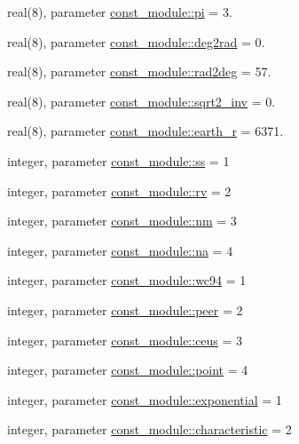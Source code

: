 \begin{DoxyCompactItemize}
\item 
real(8), parameter \hyperlink{namespaceconst__module_a6e2d7a0e80dfe577ca95736d3e143899}{const\+\_\+module\+::pi} = 3.
\item 
real(8), parameter \hyperlink{namespaceconst__module_a87cf12ab3afb0ddc5f58492d1fb1d828}{const\+\_\+module\+::deg2rad} = 0.
\item 
real(8), parameter \hyperlink{namespaceconst__module_a61843a48c8dec76293f423c682c8d772}{const\+\_\+module\+::rad2deg} = 57.
\item 
real(8), parameter \hyperlink{namespaceconst__module_aa70be203aa6a91ce3961b81a6eae1e60}{const\+\_\+module\+::sqrt2\+\_\+inv} = 0.
\item 
real(8), parameter \hyperlink{namespaceconst__module_ab766035166a55b031df25669f66e7b06}{const\+\_\+module\+::earth\+\_\+r} = 6371.
\item 
integer, parameter \hyperlink{namespaceconst__module_afdf6c6b7ffea232bbc86b7ffef8298dc}{const\+\_\+module\+::ss} = 1
\item 
integer, parameter \hyperlink{namespaceconst__module_a2fac1c74f2a81234dec392f6ad1c73ea}{const\+\_\+module\+::rv} = 2
\item 
integer, parameter \hyperlink{namespaceconst__module_a45c7ab4515e2c0068ca69e5f4fed8a51}{const\+\_\+module\+::nm} = 3
\item 
integer, parameter \hyperlink{namespaceconst__module_a437f551584bfdf420d4b28c829759eb5}{const\+\_\+module\+::na} = 4
\item 
integer, parameter \hyperlink{namespaceconst__module_a760935a100ba2e8695aa777f582d5a61}{const\+\_\+module\+::wc94} = 1
\item 
integer, parameter \hyperlink{namespaceconst__module_a28954bb32bf9368bbb5569a257603c57}{const\+\_\+module\+::peer} = 2
\item 
integer, parameter \hyperlink{namespaceconst__module_a6d9b6ff754fe58527edcaea132c3d736}{const\+\_\+module\+::ceus} = 3
\item 
integer, parameter \hyperlink{namespaceconst__module_aac415d96f710c33f0228284d6f5504c9}{const\+\_\+module\+::point} = 4
\item 
integer, parameter \hyperlink{namespaceconst__module_a7b2347a542b2eda2b6841e1d9fdf19f4}{const\+\_\+module\+::exponential} = 1
\item 
integer, parameter \hyperlink{namespaceconst__module_ab9dc6742ce1e2309dd194ecdd254779d}{const\+\_\+module\+::characteristic} = 2

\end{DoxyCompactItemize}
